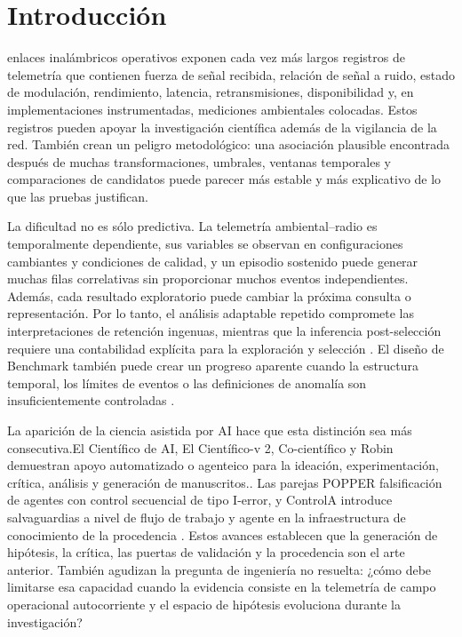 \documentclass{ieeeaccess}
\begin{document}
\section{Introducción}\label{introducciuxf3n}

enlaces inalámbricos operativos exponen cada vez más largos registros de telemetría que contienen fuerza de señal recibida, relación de señal a ruido, estado de modulación, rendimiento, latencia, retransmisiones, disponibilidad y, en implementaciones instrumentadas, mediciones ambientales colocadas. Estos registros pueden apoyar la investigación científica además de la vigilancia de la red. También crean un peligro metodológico: una asociación plausible encontrada después de muchas transformaciones, umbrales, ventanas temporales y comparaciones de candidatos puede parecer más estable y más explicativo de lo que las pruebas justifican.

La dificultad no es sólo predictiva. La telemetría ambiental--radio es temporalmente dependiente, sus variables se observan en configuraciones cambiantes y condiciones de calidad, y un episodio sostenido puede generar muchas filas correlativas sin proporcionar muchos eventos independientes. Además, cada resultado exploratorio puede cambiar la próxima consulta o representación. Por lo tanto, el análisis adaptable repetido compromete las interpretaciones de retención ingenuas, mientras que la inferencia post-selección requiere una contabilidad explícita para la exploración y selección \cite{REUSABLE-HOLDOUT-2015,POST-SELECTION-2022}. El diseño de Benchmark también puede crear un progreso aparente cuando la estructura temporal, los límites de eventos o las definiciones de anomalía son insuficientemente controladas \cite{TSAD-BENCHMARKS-2023}.

La aparición de la ciencia asistida por AI hace que esta distinción sea más consecutiva.El Científico de AI, El Científico-v 2, Co-científico y Robin demuestran apoyo automatizado o agenteico para la ideación, experimentación, crítica, análisis y generación de manuscritos.\cite{AI-SCIENTIST-2024,AI-SCIENTIST-V2-2025,CO-SCIENTIST-2026,ROBIN-2026}. Las parejas POPPER falsificación de agentes con control secuencial de tipo I-error, y ControlA introduce salvaguardias a nivel de flujo de trabajo y agente en la infraestructura de conocimiento de la procedencia \cite{POPPER-2025,CONTROLA-2025}. Estos avances establecen que la generación de hipótesis, la crítica, las puertas de validación y la procedencia son el arte anterior. También agudizan la pregunta de ingeniería no resuelta: ¿cómo debe limitarse esa capacidad cuando la evidencia consiste en la telemetría de campo operacional autocorriente y el espacio de hipótesis evoluciona durante la investigación?
\end{document}
